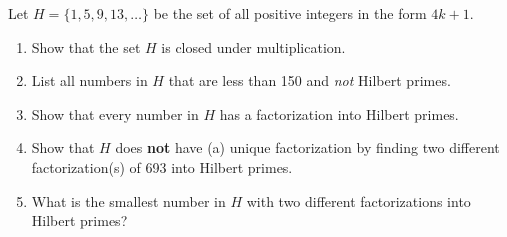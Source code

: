 \documentclass{article}
\begin{document}
\begin{problem}{}{}
    Let $H=\{1,5,9,13,\dots\}$ be the set of all positive integers in the form $4k+1$.
    \begin{enumerate}[label=\textbf{\alph*}.]
        \item Show that the set $H$ is closed under multiplication.
        \item List all numbers in $H$ that are less than 150 and \textit{not} Hilbert primes.
        \item Show that every number in $H$ has a factorization into Hilbert primes.
        \item Show that $H$ does \textbf{not} have (a) unique factorization by finding two different factorization(s) of 693 into Hilbert primes.
        \item What is the smallest number in $H$ with two different factorizations into Hilbert primes?
    \end{enumerate}
\end{problem}
\end{document}
